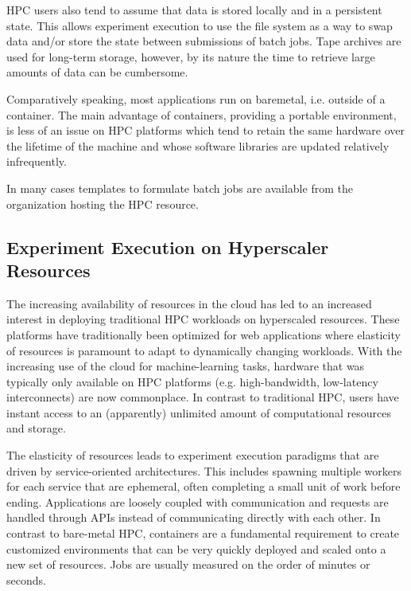 \documentclass[utf8]{FrontiersinVancouver} %
\begin{document}
HPC users also tend to assume that data is stored locally and in a persistent state. This allows experiment execution to use the file system as a way to swap data and/or store the state between submissions of batch jobs. Tape archives are used for long-term storage, however, by its nature the time to retrieve large amounts of data can be cumbersome.

Comparatively speaking, most applications run on baremetal, i.e. outside of a container. The main advantage of containers, providing a portable environment, is less of an issue on HPC platforms which tend to retain the same hardware over the lifetime of the machine and whose software libraries are updated relatively infrequently.

In many cases templates to formulate batch jobs are available from the organization hosting the HPC resource.

\subsection{Experiment Execution on Hyperscaler Resources}

The increasing availability of resources in the cloud has led to an increased interest in deploying traditional HPC workloads on hyperscaled resources. These platforms have traditionally been optimized for web applications where elasticity of resources is paramount to adapt to dynamically changing workloads.  With the increasing use of the cloud for machine-learning tasks, hardware that was typically only available on HPC platforms (e.g. high-bandwidth, low-latency interconnects) are now commonplace. In contrast to traditional HPC, users have instant access to an (apparently) unlimited amount of computational resources and storage.

The elasticity of resources leads to experiment execution paradigms that are driven by service-oriented architectures. This includes spawning multiple workers for each service that are ephemeral, often completing a small unit of work before ending. Applications are loosely coupled with communication and requests are handled through APIs instead of communicating directly with each other.  In contrast to bare-metal HPC, containers are a fundamental requirement to create customized environments that can be very quickly deployed and scaled onto a new set of resources. Jobs are usually measured on the order of minutes or seconds.
\end{document}
